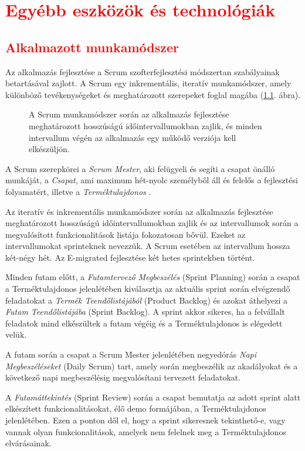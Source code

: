 \chapter{\textcolor{red}{Egyébb eszközök és technológiák}}\label{ch:egyebb_eszkozok}
\section{\textcolor{red}{Alkalmazott munkamódszer}}
Az alkalmazás fejlesztése a Scrum szofterfejlesztési módszertan szabályainak betartásával zajlott. A Scrum egy inkrementális, iteratív munkamódszer, amely különböző tevékenységeket és meghatározott szerepeket foglal magába (\ref{fig:scrum}. ábra). 
\begin{figure}
  \centering
  \caption{A Scrum munkamódszer során az alkalmazás fejlesztése meghatározott hosszúságú időintervallumokban zajlik, és minden intervallum végén az alkalmazás egy működő verziója kell elkészüljön.}
  \label{fig:scrum}
\end{figure}
A Scrum szerepkörei a \textit{Scrum Mester}, aki felügyeli és segíti a csapat önálló munkáját, a \textit{Csapat}, ami maximum hét-nyolc személyből áll és felelős a fejlesztési folyamatért, illetve a \textit{Terméktulajdonos} \cite{Scrum}. 

Az iteratív és inkrementális munkamódszer során az alkalmazás fejlesztése meghatározott hosszúságú időintervallumokban zajlik és az intervallumok során a megvalósított funkcionalitások listája fokozatosan bővül. Ezeket az intervallumokat sprinteknek nevezzük. A Scrum esetében az intervallum hossza két-négy hét. Az E-migrated fejlesztése két hetes sprintekben történt.

Minden futam előtt, a \textit{Futamtervező Megbeszélés} (Sprint Planning) során a csapat a Terméktulajdonos jelenlétében kiválasztja az aktuális sprint során elvégzendő feladatokat a \textit{Termék Teendőlistájából} (Product Backlog) és azokat áthelyezi a \textit{Futam Teendőlistájába} (Sprint Backlog). A sprint akkor sikeres, ha a felvállalt feladatok mind elkészültek a futam végéig és a Terméktulajdonos is elégedett velük. 

A futam során a csapat a Scrum Mester jelenlétében negyedórás \textit{Napi Megbeszéléseket} (Daily Scrum) tart, amely során megbeszélik az akadályokat és a következő napi megbeszélésig megvalósítani tervezett feladatokat. 

A \textit{Futamáttekintés} (Sprint Review) során a csapat bemutatja az adott sprint alatt elkészített funkcionalitásokat, élő demo formájában, a Terméktulajdonos jelenlétében. Ezen a ponton dől el, hogy a sprint sikeresnek tekinthető-e, vagy vannak olyan funkcionalitások, amelyek nem felelnek meg a Terméktulajdonos elvárásainak. 


